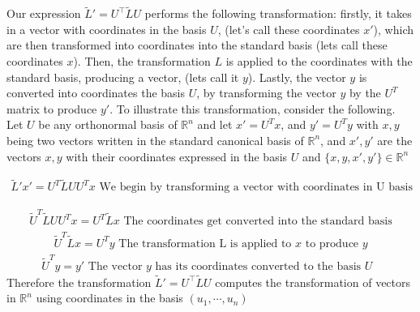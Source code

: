 \documentclass[12pt,twoside]{article}
\begin{document}
Our expression $\tilde L ' = U^\top \tilde L U$ performs the following transformation: firstly, it takes in a vector with coordinates in the basis $U$, (let's call these coordinates $x'$), which are then transformed into coordinates into the standard basis (lets call these coordinates $x$). Then, the transformation $L$ is applied to the coordinates with the standard basis, producing a vector, (lets call it $y$). Lastly, the vector $y$ is  converted into coordinates the basis $U$, by transforming the vector $y$ by the $U^T$ matrix to produce $y'$. To illustrate this transformation, consider the following. \\

Let $U$ be any orthonormal basis of $\mathbb{R}^n$ and let $x'= U^T x$, and $y' = U^T y$ with $x,y$ being two vectors written in the standard canonical basis of $\mathbb{R}^n$, and $x',y'$ are the vectors $x,y$ with their coordinates expressed in the basis $U$ and  $\{x,y,x',y'\} \in \mathbb{R}^n$

\begin{equation}
    \begin{split}
        \tilde L ' x' = U^T \tilde L U U^T x \text{ We begin by transforming a vector with coordinates in U basis}
    \end{split}
\end{equation}

\begin{equation}
    \begin{split}
        \tilde  U^T \tilde L U U^T x = U^T \tilde L x \text{ The coordinates get converted into the standard basis}
    \end{split}
\end{equation}
\begin{equation}
    \begin{split}
        \tilde  U^T \tilde L x = U^T y \text{ The transformation L is applied to $x$ to produce $y$}
    \end{split}
\end{equation}
\begin{equation}
    \begin{split}
        \tilde  U^T y  = y' \text{ The vector $y$ has its coordinates converted to the basis $U$ }
    \end{split}
\end{equation}
Therefore the transformation $\tilde L ' = U^\top \tilde L U$ computes the transformation of vectors in $\mathbb{R}^n$ using coordinates in the basis $(u_1, \cdots, u_n)$
\end{document}
